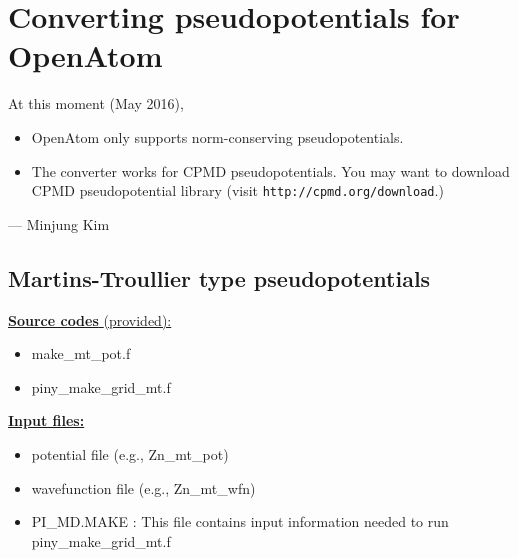 %
%
%
%
%
%
%
%
%

\section{Converting pseudopotentials for OpenAtom}


At this moment (May 2016),
\begin{itemize}
\item OpenAtom only supports norm-conserving pseudopotentials.
\item The converter works for CPMD pseudopotentials. You may want to download CPMD pseudopotential library (visit \verb+http://cpmd.org/download+.)
\end{itemize}
--- Minjung Kim

\subsection{Martins-Troullier type pseudopotentials}


\noindent
\underline{ {\bf Source codes }(provided): }
	\begin{itemize}
	\item make{\_}mt{\_}pot.f
	\item piny{\_}make{\_}grid{\_}mt.f
	\end{itemize}
	
\vskip 12pt
\noindent
\underline{ {\bf Input files:} }
	\begin{itemize}
	\item potential file (e.g., Zn{\_}mt{\_}pot)
	\item wavefunction file (e.g., Zn{\_}mt{\_}wfn)
	\item PI{\_}MD.MAKE : This file contains input information needed to run piny{\_}make{\_}grid{\_}mt.f
	\end{itemize}

